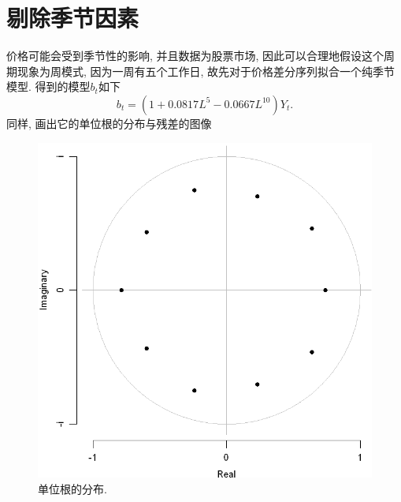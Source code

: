 \documentclass[11pt]{article}
\begin{document}
\section{剔除季节因素}
\qquad 价格可能会受到季节性的影响, 并且数据为股票市场, 因此可以合理地假设这个周期现象为周模式, 因为一周有五个工作日, 故先对于价格差分序列拟合一个纯季节模型. 得到的模型$b_t$如下
\[
    b_t=(1+0.0817L^5-0.0667L^{10})Y_t.  
\]
同样, 画出它的单位根的分布与残差的图像
\begin{center}
    \hspace{30pt}\begin{minipage}{0.45\textwidth}
        \begin{figure}
            \centering
            \hspace{-30pt}\includegraphics[width=.9\textwidth]{output_23_0}
            \caption{单位根的分布.\label{fig:8}}
        \end{figure}
    \end{minipage}
    \begin{minipage}{0.45\textwidth}
        \begin{figure}
            \centering

\end{figure}
\end{minipage}
\end{center}
\end{document}
